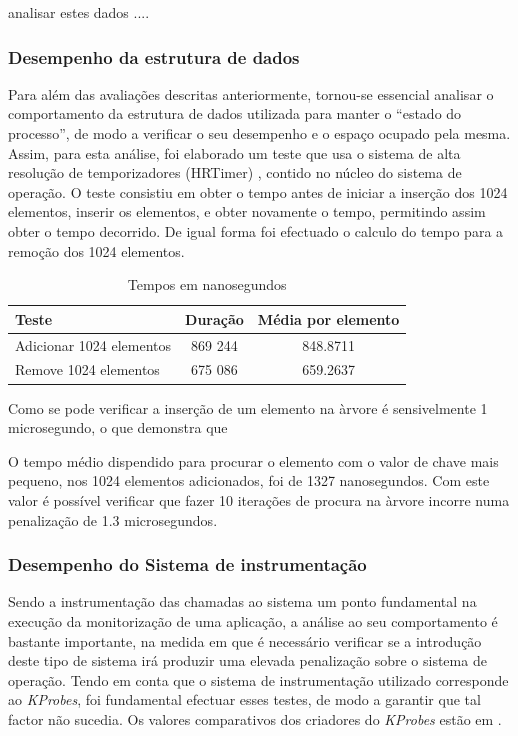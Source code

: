 \documentclass[a4paper]{llncs}
\begin{document}
analisar estes dados ....

\subsubsection{Desempenho da estrutura de dados}
Para além das avaliações descritas anteriormente, tornou-se essencial analisar o comportamento da estrutura de dados utilizada para manter o “estado do processo”, de modo a verificar o seu desempenho e o espaço ocupado pela mesma. Assim, para esta análise, foi elaborado um teste que usa o sistema de alta resolução de temporizadores (HRTimer) \cite{hrtimerKernel}, contido no núcleo do sistema de operação.
O teste consistiu em obter o tempo antes de iniciar a inserção dos 1024 elementos, inserir os elementos, e obter novamente o tempo, permitindo assim obter o tempo decorrido. De igual forma foi efectuado o calculo do tempo para a remoção dos 1024 elementos.

\begin{table}
\begin{center}

\begin{tabular}{ | l | c | c | }
\hline
\hspace{1.2cm} Teste \hspace{1cm} & \hspace{1cm}Duração\hspace{1cm} &  Média por
elemento \\
\hline
Adicionar 1024 elementos & 869 244 & 848.8711 \\
\hline
Remove 1024 elementos & 675 086 & 659.2637\\
\hline

\hline
\end{tabular}
\caption{Tempos em nanosegundos}
\label{tab:tree_info}
\end{center}
\end{table}

Como se pode verificar a inserção de um elemento na àrvore é sensivelmente 1 microsegundo, o que demonstra que

O tempo médio dispendido para procurar o elemento com o valor de chave mais pequeno, nos 1024 elementos adicionados, foi de 1327 nanosegundos. Com este valor é possível verificar que fazer 10 iterações de procura na àrvore incorre numa penalização de 1.3 microsegundos.

\subsubsection{Desempenho do Sistema de instrumentação}
Sendo a instrumentação das chamadas ao sistema um ponto fundamental na execução da monitorização de uma aplicação, a análise ao seu comportamento é bastante importante, na medida em que é necessário verificar se a introdução deste tipo de sistema irá produzir uma elevada penalização sobre o sistema de operação. Tendo em conta que o sistema de instrumentação utilizado corresponde ao \textit{KProbes}, foi fundamental efectuar esses testes, de modo a garantir que tal factor não sucedia. Os valores comparativos dos criadores do \textit{KProbes} estão em \cite{KProbeKernel}.
\end{document}
